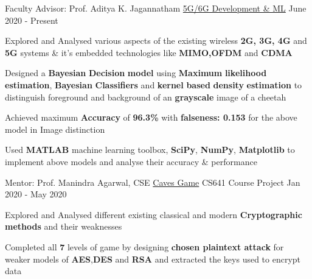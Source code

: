 
\begin{cventries}

 \cventry
    {Faculty Advisor: Prof. Aditya K. Jagannatham}
    {\href{https://github.com/RohitRanjangit/5G-6G-development}{5G/6G Development \& ML}}
    {}
    {June 2020 - Present}
    {
      \begin{cvitems}
        \item{Explored and Analysed various aspects of the existing wireless \textbf{2G, 3G, 4G} and \textbf{5G} systems \& it’s embedded technologies like \textbf{MIMO,OFDM} and \textbf{CDMA}}
        \item{Designed a \textbf{Bayesian} \textbf{Decision} \textbf{model} using \textbf{Maximum} \textbf{likelihood} \textbf{estimation}, \textbf{Bayesian} \textbf{Classifiers} and \textbf{kernel} \textbf{based} \textbf{density} \textbf{estimation} to distinguish foreground and background of an \textbf{grayscale} image of a cheetah}
        
        \item{Achieved maximum \textbf{Accuracy} of \textbf{96.3\%} with \textbf{falseness: 0.153} for the above model in Image distinction}
        \item{Used \textbf{MATLAB} machine learning toolbox, \textbf{SciPy}, \textbf{NumPy}, \textbf{Matplotlib} to implement above models and analyse their accuracy \& performance}
      \end{cvitems}
    }
  
   \cventry
    {Mentor: Prof. Manindra Agarwal, CSE}
    {\href{https://github.com/RohitRanjangit/CavesGame}{Caves Game}}
    {CS641 Course Project}
    {Jan 2020 - May 2020}
    {
      \begin{cvitems}
        \item {Explored and Analysed different existing classical and modern \textbf{Cryptographic methods} and their weaknesses}
        \item {Completed all \textbf{7} levels of game by designing \textbf{chosen plaintext attack} for weaker models of \textbf{AES},\textbf{DES} and \textbf{RSA} and extracted the keys used to encrypt data}
      \end{cvitems}
    }


\end{cventries}
